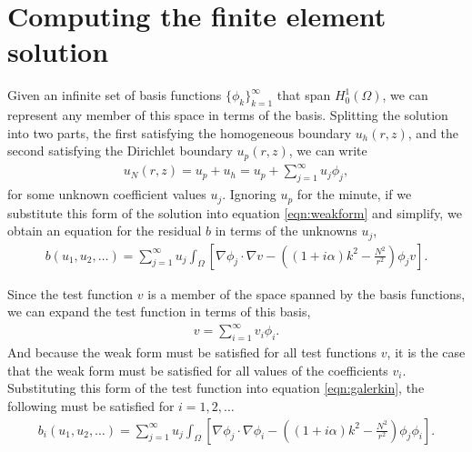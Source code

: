 
\section{Computing the finite element solution}

\iffalse
Write in residual form
- don't be equal to 0, easier to write equations.

.We're given an infinite basis.
.Expand the solution in terms of the basis functions.
.Substitute this sum into the weak form.
.Represent test functions as sum of basis functions (Galerkin).
Perform truncation of the series.
Compute the weighted residual using numerical integration.
Compute the Jacobian matrix.
Solve the linear system (MG).
Obtain the finite element solution.
\fi

Given an infinite set of basis functions $\{ \phi_k \}_{k=1}^\infty$ that span $H^1_0(\Omega)$, we can represent any member of this space in terms of the basis.
Splitting the solution into two parts, the first satisfying the homogeneous boundary $u_h(r,z)$, and the second satisfying the Dirichlet boundary $u_p(r,z)$, we can write
\begin{align}
	u_N(r,z) = u_p + u_h = u_p + \sum_{j=1}^\infty u_j \phi_j,
\end{align}
for some unknown coefficient values $u_j$.
Ignoring $u_p$ for the minute, if we substitute this form of the solution into equation \eqref{eqn:weakform} and simplify, we obtain an equation for the residual $b$ in terms of the unknowns $u_j$,
\begin{align}
	b(u_1,u_2,\ldots) = \sum_{j=1}^\infty u_j \int_\Omega \left[ \nabla \phi_j \cdot \nabla v - \left( (1+i\alpha)k^2 - \frac{N^2}{r^2}\right) \phi_j v \right]. \label{eqn:galerkin}
\end{align}

Since the test function $v$ is a member of the space spanned by the basis functions, we can expand the test function in terms of this basis,
\begin{align}
	v = \sum_{i=1}^\infty v_i \phi_i.
\end{align}
And because the weak form must be satisfied for all test functions $v$, it is the case that the weak form must be satisfied for all values of the coefficients $v_i$.
Substituting this form of the test function into equation \eqref{eqn:galerkin}, the following must be satisfied for $i=1,2,\ldots$
\begin{align}
	b_i(u_1,u_2,\ldots)=\sum_{j=1}^\infty u_j \int_\Omega \left[ \nabla \phi_j \cdot \nabla \phi_i - \left( (1+i\alpha)k^2 - \frac{N^2}{r^2}\right) \phi_j \phi_i \right].
\end{align}


